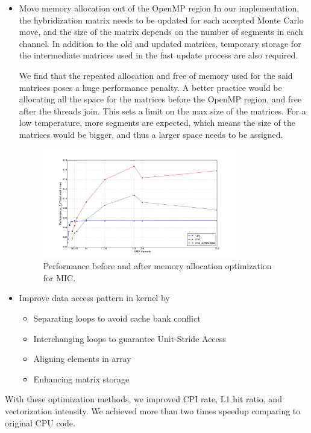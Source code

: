 \begin{itemize}
\item Move memory allocation out of the OpenMP region
 In our implementation, the hybridization matrix needs to be updated for each 
accepted Monte Carlo move, and the size of the matrix depends on the number of 
segments in each channel. In addition to the old and updated matrices, temporary
storage for the intermediate matrices used in the fast update process are also
required. 

We find that the repeated allocation and free of memory used for the
said matrices poses a huge performance penalty. A better practice would be 
allocating all the space for the matrices before the OpenMP region, and free 
after the threads join. This sets a limit on the max size of the matrices. For
a low temperature, more segments are expected, which means the size of the matrices
would be bigger, and thus a larger space needs to be assigned. 

\begin{figure}
  \centering
  \includegraphics[width=0.8\textwidth] {img/mic/memory.png}
  \caption{Performance before and after memory allocation optimization for MIC.}
\end{figure}


\item Improve data access pattern in kernel by
\begin{itemize}
  \item Separating loops to avoid cache bank conflict
  \item Interchanging loops to guarantee Unit-Stride Access
  \item Aligning elements in array
  \item Enhancing matrix storage
\end{itemize}
\end{itemize}
With these optimization methods, we improved CPI rate, L1 hit ratio, and 
vectorization intensity. We achieved more than two times speedup comparing to 
original CPU code.


